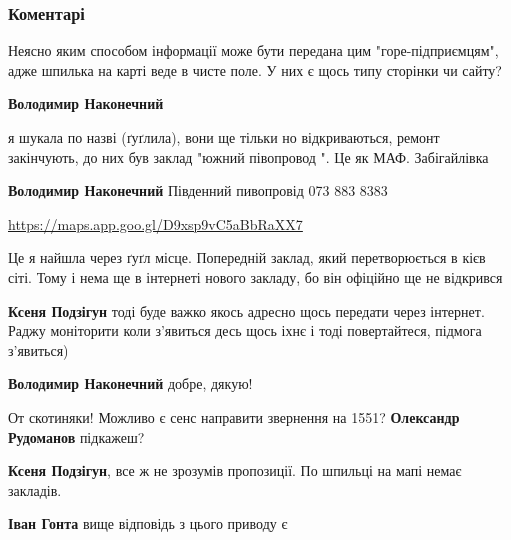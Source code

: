  
 
 
 
 
\subsubsection{Коментарі}

\begin{itemize} %

Неясно яким способом інформації може бути передана цим "горе-підприємцям", адже
шпилька на карті веде в чисте поле. У них є щось типу сторінки чи сайту?

\begin{itemize} %
\textbf{Володимир Наконечний} 

я шукала по назві (ґуґлила), вони ще тільки но відкриваються, ремонт
закінчують, до них був заклад "южний півопровод ". Це як МАФ. Забігайлівка

\textbf{Володимир Наконечний}
Південний пивопровід
073 883 8383\par
\url{https://maps.app.goo.gl/D9xsp9vC5aBbRaXX7}

Це я найшла через ґуґл місце. Попередній заклад, який перетворюється в кієв
сіті. Тому і нема ще в інтернеті нового закладу, бо він офіційно ще не
відкрився

\begin{itemize} %
\textbf{Ксеня Подзігун} тоді буде важко якось адресно щось передати через інтернет. Раджу моніторити коли з'явиться десь щось іхнє і тоді повертайтеся, підмога з'явиться)

\textbf{Володимир Наконечний} добре, дякую!
\end{itemize} %

От скотиняки! Можливо є сенс направити звернення на 1551? \textbf{Олександр Рудоманов} підкажеш?

\end{itemize} %

\textbf{Ксеня Подзігун}, все ж не зрозумів пропозиції. По шпильці на мапі немає закладів.

\begin{itemize} %
\textbf{Іван Гонта} вище відповідь з цього приводу є


\end{itemize}
\end{itemize}
